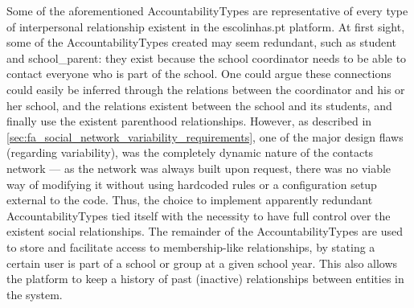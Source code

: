 
Some of the aforementioned AccountabilityTypes are representative of every type of interpersonal relationship existent in the escolinhas.pt platform. At first sight, some of the AccountabilityTypes created may seem redundant, such as student and school\_parent: they exist because the school coordinator needs to be able to contact everyone who is part of the school. One could argue these connections could easily be inferred through the relations between the coordinator and his or her school, and the relations existent between the school and its students, and finally use the existent parenthood relationships. However, as described in \ref{sec:fa_social_network_variability_requirements}, one of the major design flaws (regarding variability), was the completely dynamic nature of the contacts network --- as the network was always built upon request, there was no viable way of modifying it without using hardcoded rules or a configuration setup external to the code. Thus, the choice to implement apparently redundant AccountabilityTypes tied itself with the necessity to have full control over the existent social relationships. The remainder of the AccountabilityTypes are used to store and facilitate access to membership-like relationships, by stating a certain user is part of a school or group at a given school year. This also allows the platform to keep a history of past (inactive) relationships between entities in the system.

